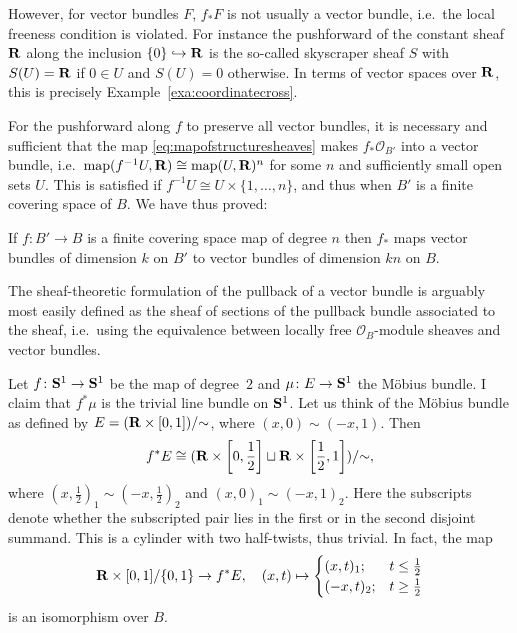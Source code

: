 \documentclass[a4paper,openany]{scrbook}
\begin{document}
However, for vector bundles $F$, $f_*F$ is not usually a vector bundle, i.e.\ the local freeness condition is violated. For instance the pushforward of the constant sheaf $\R$ along the inclusion $\{0\} \hookrightarrow \R$ is the so-called skyscraper sheaf $S$ with $S(U) = \R$ if $0 \in U$ and $S(U) = 0$ otherwise. In terms of vector spaces over $\R$, this is precisely Example~\ref{exa:coordinatecross}.

For the pushforward along $f$ to preserve all vector bundles, it is necessary and sufficient that the map \eqref{eq:mapofstructuresheaves} makes $f_*\mathcal O_{B'}$ into a vector bundle, i.e.\ $\map(f^{-1}U,\R) \cong \map(U,\R)^n$ for some $n$ and sufficiently small open sets $U$. This is satisfied if $f^{-1}U \cong U \times \{1,\dots,n\}$, and thus when $B'$ is a finite covering space of $B$. We have thus proved:

\begin{thm}\label{thm:covpushforward}
If $f\colon B' \to B$ is a finite covering space map of degree $n$ then $f_*$ maps vector bundles of dimension $k$ on $B'$ to vector bundles of dimension $kn$ on $B$.
\end{thm}

The sheaf-theoretic formulation of the pullback of a vector bundle is arguably most easily defined as the sheaf of sections of the pullback bundle associated to the sheaf, i.e.\ using the equivalence between locally free $\mathcal O_B$-module sheaves and vector bundles.

\begin{example}
Let $f\colon \S^1 \to \S^1$ be the map of degree~$2$ and $\mu\colon E \to \S^1$ the Möbius bundle. I claim that $f^*\mu$ is the trivial line bundle on $\S^1$. Let us think of the Möbius bundle as defined by $E = (\R \times [0,1])/\mathord\sim$, where $(x,0) \sim (-x,1)$. Then
\[
f^*E \cong (\R \times \left[0,\frac12\right] \sqcup \R \times \left[\frac12,1\right])/\mathord\sim,
\]
where $(x,\frac12)_1 \sim (-x,\frac12)_2$ and $(x,0)_1 \sim (-x,1)_2$. Here the subscripts denote whether the subscripted pair lies in the first or in the second disjoint summand. This is a cylinder with two half-twists, thus trivial. In fact, the map
\[
\R \times [0,1]/\{0,1\} \to f^*E, \quad (x,t) \mapsto \begin{cases} (x,t)_1; & t \leq \frac12\\(-x,t)_2; & t \geq \frac12\end{cases}
\]
is an isomorphism over $B$.
\end{example}
\end{document}

